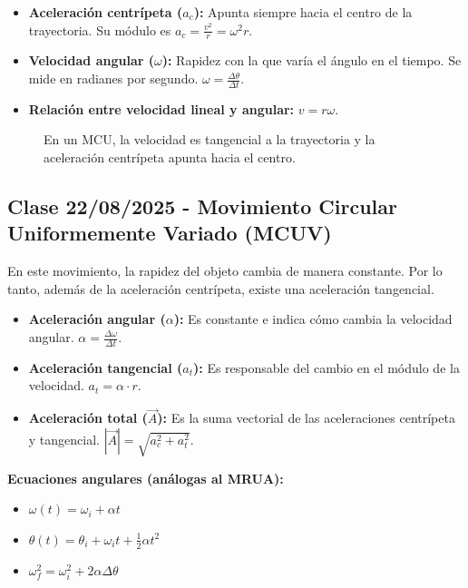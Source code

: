\documentclass[11pt]{article}
\begin{document}
\begin{itemize}
	\item \textbf{Aceleración centrípeta ($a_c$):} Apunta siempre hacia el centro de la trayectoria. Su módulo es $a_c = \frac{v^2}{r} = \omega^2 r$.
	\item \textbf{Velocidad angular ($\omega$):} Rapidez con la que varía el ángulo en el tiempo. Se mide en radianes por segundo. $\omega = \frac{\Delta \theta}{\Delta t}$.
	\item \textbf{Relación entre velocidad lineal y angular:} $v = r\omega$.
\end{itemize}

\begin{figure}[h!]
	\centering
	\caption{En un MCU, la velocidad es tangencial a la trayectoria y la aceleración centrípeta apunta hacia el centro.}
\end{figure}


\subsection{Clase 22/08/2025 - Movimiento Circular Uniformemente Variado (MCUV)}
En este movimiento, la rapidez del objeto cambia de manera constante. Por lo tanto, además de la aceleración centrípeta, existe una aceleración tangencial.

\begin{itemize}
	\item \textbf{Aceleración angular ($\alpha$):} Es constante e indica cómo cambia la velocidad angular. $\alpha = \frac{\Delta \omega}{\Delta t}$.
	\item \textbf{Aceleración tangencial ($a_t$):} Es responsable del cambio en el módulo de la velocidad. $a_t = \alpha \cdot r$.
	\item \textbf{Aceleración total ($\vec{A}$):} Es la suma vectorial de las aceleraciones centrípeta y tangencial. $|\vec{A}| = \sqrt{a_c^2 + a_t^2}$.
\end{itemize}

\textbf{Ecuaciones angulares (análogas al MRUA):}
\begin{itemize}
	\item $\omega(t) = \omega_i + \alpha t$
	\item $\theta(t) = \theta_i + \omega_i t + \frac{1}{2}\alpha t^2$
	\item $\omega_f^2 = \omega_i^2 + 2\alpha \Delta\theta$
\end{itemize}
\end{document}
